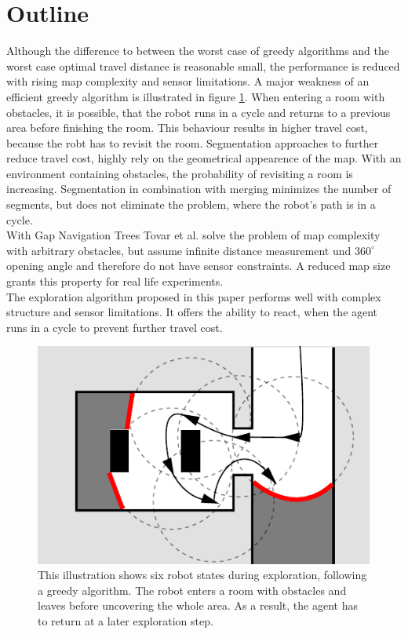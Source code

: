 \documentclass[twocolumn]{svjour3}[2016]
\begin{document}
\section{Outline}
Although the difference to between the worst case of greedy algorithms and the worst case optimal travel distance is reasonable small, the performance is reduced with rising map complexity and sensor limitations.
A major weakness of an efficient greedy algorithm is illustrated in figure \ref{fig:1}. When entering a room with obstacles, it is possible, that the robot runs in a cycle and returns to a previous area before finishing the room. This behaviour results in higher travel cost, because the robt has to revisit the room. Segmentation approaches \cite{dirk_holz_evaluating_2010, kai_m._wurm_coordinated_2008} to further reduce travel cost, highly rely on the geometrical appearence of the map. With an environment containing obstacles, the probability of revisiting a room is increasing. Segmentation in combination with merging minimizes the number of segments, but does not eliminate the problem, where the robot's path is in a cycle.\\
With Gap Navigation Trees Tovar et al. \cite{benjamin_tovar_optimal_2003} solve the problem of map complexity with arbitrary obstacles, but assume infinite distance measurement und $360^{\circ}$ opening angle and therefore do not have sensor constraints. A reduced map size grants this property for real life experiments.\\
The exploration algorithm proposed in this paper performs well with complex structure and sensor limitations. It offers the ability to react, when the agent runs in a cycle to prevent further travel cost.

\begin{figure}
  \includegraphics{figures/fig1.pdf}
  \caption{
  This illustration shows six robot states during exploration, following a greedy algorithm. The robot enters a room with obstacles and leaves before uncovering the whole area. As a result, the agent has to return at a later exploration step.}
  \label{fig:1}       %
\end{figure}
\end{document}
